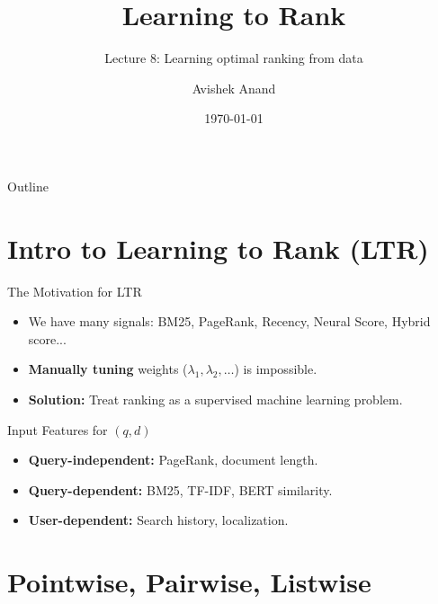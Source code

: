 \documentclass[aspectratio=169]{beamer}
\title[Learning to Rank]{Learning to Rank}
\subtitle{Lecture 8: Learning optimal ranking from data}
\author{Avishek Anand}
\institute{Information Retrieval}
\date{\today}
\begin{document}
\begin{frame}
\titlepage
\end{frame}



\begin{frame}{Outline}
\tableofcontents
\end{frame}

\section{Intro to Learning to Rank (LTR)}

\begin{frame}{The Motivation for LTR}
\begin{itemize}
    \item We have many signals: BM25, PageRank, Recency, Neural Score, Hybrid score...
    \item \textbf{Manually tuning} weights ($\lambda_1, \lambda_2, \dots$) is impossible.
    \item \textbf{Solution:} Treat ranking as a supervised machine learning problem.
\end{itemize}

\vspace{1em}
\begin{block}{Input Features for $(q, d)$}
\begin{itemize}
    \item \textbf{Query-independent:} PageRank, document length.
    \item \textbf{Query-dependent:} BM25, TF-IDF, BERT similarity.
    \item \textbf{User-dependent:} Search history, localization.
\end{itemize}
\end{block}
\end{frame}

\section{Pointwise, Pairwise, Listwise}
\end{document}
